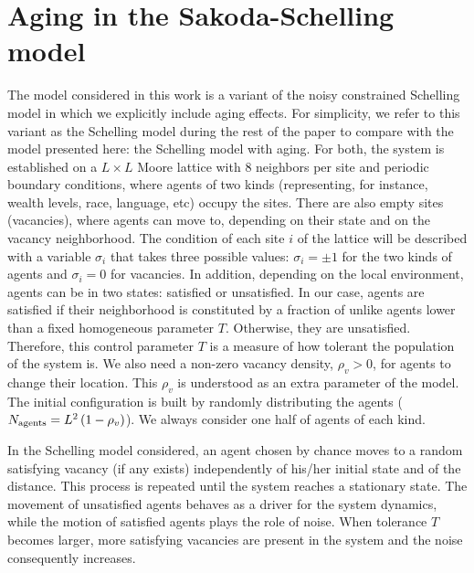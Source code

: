 
\section{Aging in the Sakoda-Schelling model}

The model considered in this work is a variant of the noisy constrained Schelling model \cite{Gauvin_2009} in which we explicitly include aging effects. For simplicity, we refer to this variant as the Schelling model during the rest of the paper to compare with the model presented here: the Schelling model with aging. For both, the system is established on a $L \times L$ Moore lattice with $8$ neighbors per site and periodic boundary conditions, where agents of two kinds (representing, for instance, wealth levels, race, language, etc) occupy the sites. There are also empty sites (vacancies), where agents can move to, depending on their state and on the vacancy neighborhood. The condition of each site $i$ of the lattice will be described with a variable  $\sigma_i$ that takes three possible values: $\sigma_i = \pm 1$ for the two kinds of agents and $\sigma_i = 0$ for vacancies. In addition, depending on the local environment, agents can be in two states: satisfied or unsatisfied. In our case, agents are satisfied if their neighborhood is constituted by a fraction of unlike agents lower than a fixed homogeneous parameter $T$. Otherwise, they are unsatisfied. Therefore, this control parameter $T$ is a measure of how tolerant the population of the system is. We also need a non-zero vacancy density, $\rho_v > 0$, for agents to change their location. This $\rho_v$ is understood as an extra parameter of the model. The initial configuration is built by randomly distributing the agents ($N_{\rm agents} = L^2 \, (1 - \rho_v)$). We always consider one half of agents of each kind.

In the Schelling model considered, an agent chosen by chance moves to a random satisfying vacancy (if any exists) independently of his/her initial state and of the distance. This process is repeated until the system reaches a stationary state. The movement of unsatisfied agents behaves as a driver for the system dynamics, while the motion of satisfied agents plays the role of noise. When tolerance $T$ becomes larger, more satisfying vacancies are present in the system and the noise consequently increases. 

